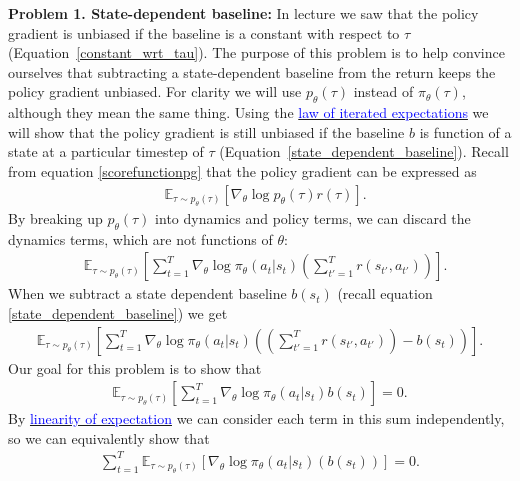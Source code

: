\documentclass[12pt]{article}
\begin{document}
\textbf{Problem 1. State-dependent baseline:}
In lecture we saw that the policy gradient is unbiased if the baseline is a constant with respect to $\tau$ (Equation~\ref{constant_wrt_tau}). The purpose of this problem is to help convince ourselves that subtracting a state-dependent baseline from the return keeps the policy gradient unbiased. For clarity we will use $p_\theta(\tau)$ instead of $\pi_\theta(\tau)$, although they mean the same thing. Using the \href{https://en.wikipedia.org/wiki/Law_of_total_expectation}{\textcolor{blue}{law of iterated expectations}} we will show that the policy gradient is still unbiased if the baseline $b$ is function of a state at a particular timestep of $\tau$ (Equation~\ref{state_dependent_baseline}). Recall from equation \ref{scorefunctionpg} that the policy gradient can be expressed as
\begin{align*}
&\mathbb{E}_{\tau \sim p_\theta(\tau)} \left[\nabla_\theta \log p_\theta(\tau)r(\tau)\right].
\end{align*}
By breaking up $p_\theta(\tau)$ into dynamics and policy terms, we can discard the dynamics terms, which are not functions of $\theta$:
\begin{align*}
&\mathbb{E}_{\tau \sim p_\theta(\tau)} \left[\sum_{t=1}^T \nabla_\theta \log \pi_\theta(a_t|s_t) \left(\sum_{t'=1}^T r(s_{t'}, a_{t'})\right)\right].
\end{align*}
When we subtract a state dependent baseline $b(s_t)$ (recall equation \ref{state_dependent_baseline}) we get
\begin{align*}
\mathbb{E}_{\tau \sim p_\theta(\tau)} \left[\sum_{t=1}^T \nabla_\theta \log \pi_\theta(a_t|s_t) \left(\left(\sum_{t'=1}^T r(s_{t'}, a_{t'})\right) - b(s_t)\right)\right].
\end{align*}
Our goal for this problem is to show that 
\begin{align*}
\mathbb{E}_{\tau \sim p_\theta(\tau)} \left[\sum_{t=1}^T \nabla_\theta \log \pi_\theta(a_t|s_t) b(s_t)\right] = 0.
\end{align*}
By \href{https://brilliant.org/wiki/linearity-of-expectation/}{\textcolor{blue}{linearity of expectation}} we can consider each term in this sum independently, so we can equivalently show that
\begin{align} \label{independent}
\sum_{t=1}^T \mathbb{E}_{\tau \sim p_\theta(\tau)}\left[ \nabla_\theta \log \pi_\theta(a_t|s_t) \left(b(s_t)\right)\right] = 0.
\end{align}
\end{document}
